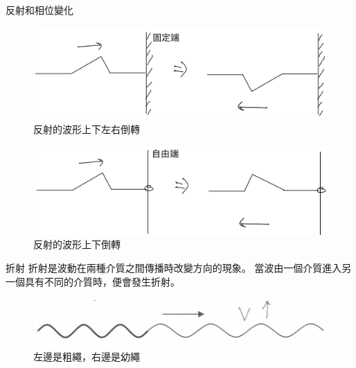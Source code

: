 \documentclass[13pt]{beamer}
\begin{document}
\begin{frame}{反射和相位變化}
    \begin{figure}
        \centering
        \includegraphics[width=0.75\linewidth]{images/IMG_6F6A16553544-1.jpeg}
        \caption{反射的波形上下左右倒轉}
    \end{figure}
    \begin{figure}
        \centering
        \includegraphics[width=0.75\linewidth]{images/IMG_CBCFA4B99FBF-1.jpeg}
        \caption{反射的波形上下倒轉}
    \end{figure}

\end{frame}



\begin{frame}{折射}
    折射是波動在兩種介質之間傳播時改變方向的現象。
    當波由一個介質進入另一個具有不同的介質時，便會發生折射。
    \begin{figure}
        \centering
        \includegraphics[width=0.75\linewidth]{images/Screenshot 2023-09-27 at 7.33.45 PM.png}
        \caption{左邊是粗繩，右邊是幼繩}

    \end{figure}
\end{frame}
\end{document}
